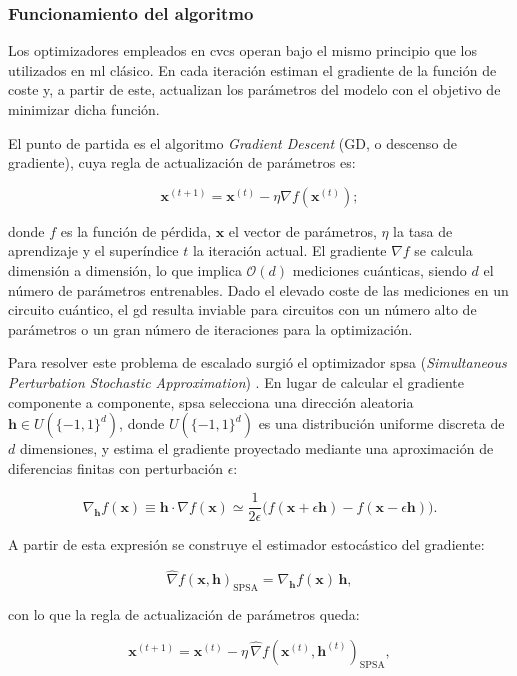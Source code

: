 \subsubsection{Funcionamiento del algoritmo}

Los optimizadores empleados en \glspl{cvc} operan bajo el mismo principio que los utilizados en \gls{ml} clásico. En cada iteración estiman el gradiente de la función de coste y, a partir de este, actualizan los parámetros del modelo con el objetivo de minimizar dicha función.

El punto de partida es el algoritmo \textit{Gradient Descent} (GD, o descenso de gradiente), cuya regla de actualización de parámetros es:

\[
  \mathbf{x}^{(t+1)} = \mathbf{x}^{(t)} - \eta \nabla f(\mathbf{x}^{(t)});
\]

donde $f$ es la función de pérdida, $\mathbf{x}$ el vector de parámetros, $\eta$ la tasa de aprendizaje y el superíndice $t$ la iteración actual. El gradiente $\nabla f$ se calcula dimensión a dimensión, lo que implica $\mathcal{O}(d)$ mediciones cuánticas, siendo $d$ el número de parámetros entrenables. Dado el elevado coste de las mediciones en un circuito cuántico, el \gls{gd} resulta inviable para circuitos con un número alto de parámetros o un gran número de iteraciones para la optimización.

Para resolver este problema de escalado surgió el optimizador \gls{spsa} (\textit{Simultaneous Perturbation Stochastic Approximation}) \cite{wikipedia_spsa_2026}. En lugar de calcular el gradiente componente a componente, \gls{spsa} selecciona una dirección aleatoria $\mathbf{h} \in U(\{-1, 1\}^d)$, donde $U(\{-1, 1\}^d)$ es una distribución uniforme discreta de $d$ dimensiones, y estima el gradiente proyectado mediante una aproximación de diferencias finitas con perturbación $\epsilon$:

\[
  \nabla_{\mathbf{h}} f(\mathbf{x}) \equiv \mathbf{h} \cdot \nabla f(\mathbf{x}) \simeq \frac{1}{2\epsilon} \bigl(f(\mathbf{x} + \epsilon \mathbf{h}) - f(\mathbf{x} - \epsilon \mathbf{h})\bigr).
\]

A partir de esta expresión se construye el estimador estocástico del gradiente:

\[
  \widehat{\nabla} f(\mathbf{x}, \mathbf{h})_{\text{SPSA}} = \nabla_{\mathbf{h}} f(\mathbf{x})\, \mathbf{h},
\]

con lo que la regla de actualización de parámetros queda:

\[
  \mathbf{x}^{(t+1)} = \mathbf{x}^{(t)} - \eta\, \widehat{\nabla} f(\mathbf{x}^{(t)}, \mathbf{h}^{(t)})_{\text{SPSA}},
\]

